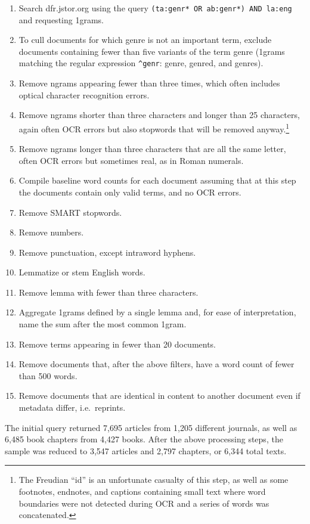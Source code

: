 \documentclass[]{book}
\providecommand{\tightlist}{%
  \setlength{\itemsep}{0pt}\setlength{\parskip}{0pt}}
\let\rmarkdownfootnote\footnote%
\def\footnote{\protect\rmarkdownfootnote}
\theoremstyle{definition}
\theoremstyle{definition}
\theoremstyle{definition}
\theoremstyle{remark}
\begin{document}
\begin{enumerate}
\def\labelenumi{\arabic{enumi}.}
\tightlist
\item
  Search dfr.jstor.org using the query
  \texttt{(ta:genr*\ OR\ ab:genr*)\ AND\ la:eng} and requesting 1grams.
\item
  To cull documents for which genre is not an important term, exclude
  documents containing fewer than five variants of the term genre
  (1grams matching the regular expression \texttt{\^{}genr}: genre,
  genred, and genres).
\item
  Remove ngrams appearing fewer than three times, which often includes
  optical character recognition errors.
\item
  Remove ngrams shorter than three characters and longer than 25
  characters, again often OCR errors but also stopwords that will be
  removed anyway.\footnote{The Freudian ``id'' is an unfortunate
    casualty of this step, as well as some footnotes, endnotes, and
    captions containing small text where word boundaries were not
    detected during OCR and a series of words was concatenated.}
\item
  Remove ngrams longer than three characters that are all the same
  letter, often OCR errors but sometimes real, as in Roman numerals.
\item
  Compile baseline word counts for each document assuming that at this
  step the documents contain only valid terms, and no OCR errors.
\item
  Remove SMART stopwords.
\item
  Remove numbers.
\item
  Remove punctuation, except intraword hyphens.
\item
  Lemmatize or stem English words.
\item
  Remove lemma with fewer than three characters.
\item
  Aggregate 1grams defined by a single lemma and, for ease of
  interpretation, name the sum after the most common 1gram.
\item
  Remove terms appearing in fewer than 20 documents.
\item
  Remove documents that, after the above filters, have a word count of
  fewer than 500 words.
\item
  Remove documents that are identical in content to another document
  even if metadata differ, i.e.~reprints.
\end{enumerate}

The initial query returned 7,695 articles from 1,205 different journals,
as well as 6,485 book chapters from 4,427 books. After the above
processing steps, the sample was reduced to 3,547 articles and 2,797
chapters, or 6,344 total texts.
\end{document}
